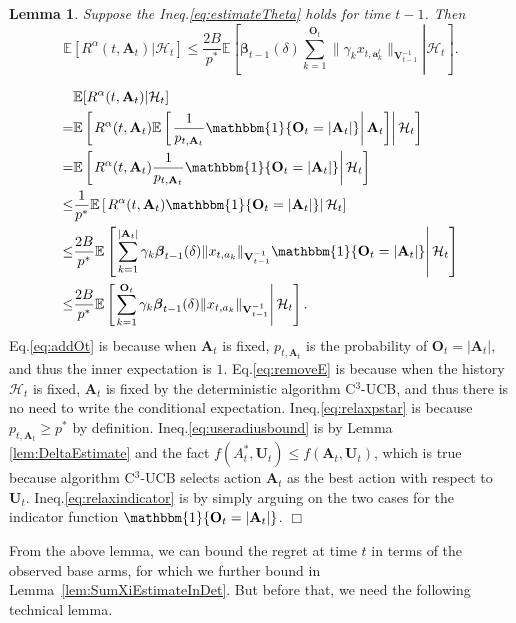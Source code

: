 \documentclass{article}
\newcommand{\bbeta}{\boldsymbol{\beta}}
\newcommand{\EE}{\mathbb{E}}
\newcommand{\bOne}{\mathbbm{1}}
\newcommand{\bA}{\mathbf{A}}
\newcommand{\ba}{\mathbf{a}}
\newcommand{\bO}{\mathbf{O}}
\newcommand{\bU}{\mathbf{U}}
\newcommand{\bV}{\mathbf{V}}
\newcommand{\cH}{\mathcal{H}}
\newcommand{\abs}[1]{\left| #1 \right|}
\newcommand{\norm}[1]{\| #1 \|}
\newtheorem{lemma}[theorem]{Lemma}%
\newenvironment{proof}{\noindent {\textbf{Proof. }}}{$\Box$ \medskip}
\begin{document}
\begin{lemma} %
	\label{lem:DeltaEsimateWithP*}
	Suppose the Ineq.\eqref{eq:estimateTheta} holds for time $t-1$. Then
	$$
	\EE[R^{\alpha}(t, \bA_t) | \cH_t] \leq \frac{2B}{p^*} \EE \left[ \left.\bbeta_{t-1}(\delta) \sum_{k=1}^{\bO_t}\norm{\gamma_k x_{t,\ba_k^t}}_{\bV_{t-1}^{-1}} \right| \cH_t \right].
	$$
\end{lemma}
\begin{proof}
	\begin{align}
		&\EE[R^{\alpha}(t, \bA_t)|\cH_t]  \nonumber \\
		=& \EE \left[ \left. R^{\alpha}(t, \bA_t) \EE \left[ \left. \frac{1}{p_{t, \bA_t}} \bOne\{\bO_t = \abs{\bA_t}\} \right| \bA_t \right]  \right| \cH_t \right] \label{eq:addOt}\\
		=& \EE \left[ \left. R^{\alpha}(t, \bA_t) \frac{1}{p_{t, \bA_t}} \bOne\{\bO_t = \abs{\bA_t}\}  \right| \cH_t \right] \label{eq:removeE}\\
		\leq &\frac{1}{p^{\ast}} \EE \left[ \left. R^{\alpha}(t, \bA_t) \bOne\{\bO_t = \abs{\bA_t}\}  \right| \cH_t \right] \label{eq:relaxpstar}\\
		\leq &\frac{2B}{p^{\ast}} \EE \left[ \left. \sum_{k=1}^{\abs{\bA_t}} \gamma_k \bbeta_{t-1}(\delta)\norm{x_{t,a_k}}_{\bV_{t-1}^{-1}} \bOne\{\bO_t = \abs{\bA_t}\}  \right| \cH_t \right] \label{eq:useradiusbound}\\
		\leq &\frac{2B}{p^{\ast}} \EE \left[ \left. \sum_{k=1}^{\bO_t} \gamma_k \bbeta_{t-1}(\delta)\norm{x_{t,a_k}}_{\bV_{t-1}^{-1}} \right| \cH_t \right]. \label{eq:relaxindicator}
	\end{align}
	Eq.\eqref{eq:addOt} is because when $\bA_t$ is fixed, $p_{t, \bA_t}$ is the probability of $\bO_t = \abs{\bA_t}$, and thus the inner expectation is $1$. Eq.\eqref{eq:removeE} is because when the history $\cH_t$ is fixed, $\bA_t$ is fixed by the deterministic algorithm C$^3$-UCB, and thus there is no need to write the conditional expectation. Ineq.\eqref{eq:relaxpstar} is because $p_{t,\bA_t} \geq p^*$ by definition. Ineq.\eqref{eq:useradiusbound} is by Lemma \ref{lem:DeltaEstimate} and the fact $f(A_t^*, \bU_t) \leq f(\bA_t, \bU_t)$, which is true because algorithm C$^3$-UCB selects action $\bA_t$ as the best action with respect to $\bU_t$. Ineq.\eqref{eq:relaxindicator} is by simply arguing on the two cases for the indicator function $\bOne\{\bO_t = \abs{\bA_t}\}$.
\end{proof}

From the above lemma, we can bound the regret at time $t$ in terms of the observed base arms, for which we further bound in Lemma~\ref{lem:SumXiEstimateInDet}.
But before that, we need the following technical lemma.
\end{document}
